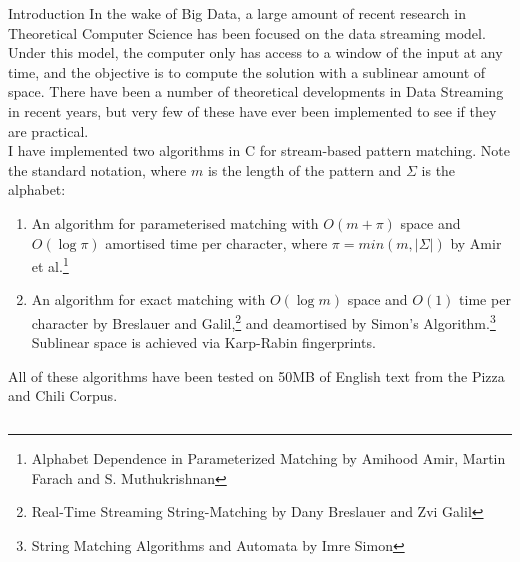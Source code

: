 \documentclass[ %
                    author={Dominic Moylett},
                supervisor={Dr. Raphael Clifford, Dr. Markus Jalsenius and Dr. Ben Sach},
                     title={An Empirical Analysis of Data Streaming Algorithms},
                  subtitle={},
                    degree={MEng},
                      year={2014} ]{poster}
\begin{document}

\begin{frame}{} 

\vfill

\begin{columns}[t]
  \begin{column}{0.900\linewidth}
  \begin{block}{\Large Introduction}
  In the wake of Big Data, a large amount of recent research in Theoretical Computer Science has been focused on the data streaming model. Under this model, the computer only has access to a window of the input at any time, and the objective is to compute the solution with a sublinear amount of space. There have been a number of theoretical developments in Data Streaming in recent years, but very few of these have ever been implemented to see if they are practical.\\
  \vspace{\baselineskip}
  I have implemented two algorithms in C for stream-based pattern matching. Note the standard notation, where $m$ is the length of the pattern and $\Sigma$ is the alphabet:
  \begin{enumerate}
  \item An algorithm for parameterised matching with $O(m + \pi)$ space and $O(\log\pi)$ amortised time per character, where $\pi=min(m, \left|\Sigma\right|)$ by Amir et al.\footnote{Alphabet Dependence in Parameterized Matching by Amihood Amir, Martin Farach and S. Muthukrishnan}
  \item An algorithm for exact matching with $O(\log m)$ space and $O(1)$ time per character by Breslauer and Galil,\footnote{Real-Time Streaming String-Matching by Dany Breslauer and Zvi Galil} and deamortised by Simon's Algorithm.\footnote{String Matching Algorithms and Automata by Imre Simon} Sublinear space is achieved via Karp-Rabin fingerprints.
  \end{enumerate}

  \noindent
  All of these algorithms have been tested on 50MB of English text from the Pizza and Chili Corpus.
  \end{block}
  \end{column}
\end{columns}

\vfill


\end{frame}
\end{document}
